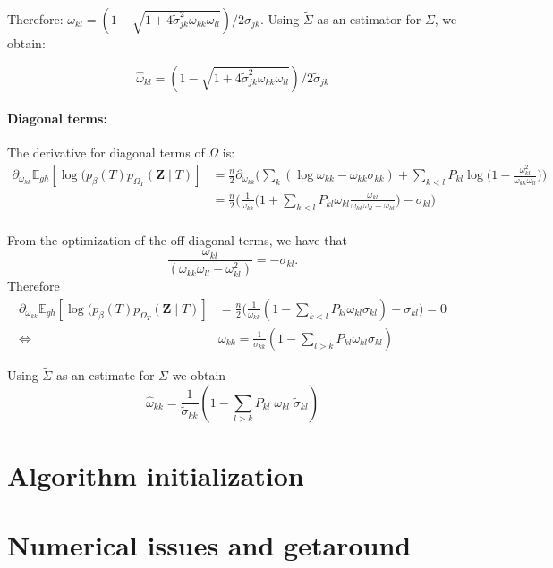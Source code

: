 \documentclass[11pt,a4paper]{article}
\newcommand{\Zbf}{\boldsymbol{Z}}
\newcommand{\Esp}{\mathds{E}}
\begin{document}
Therefore: $ {\omega}_{kl} = (1 - \sqrt{1+4\widetilde{\sigma}_{jk}^2 \omega_{kk}\omega_{ll}}) / 2{\sigma}_{jk}$. Using $\widetilde{\Sigma}$ as an estimator for $\Sigma$, we obtain:

$$\boxed{ \widehat{\omega}_{kl} = (1 - \sqrt{1+4\widetilde{\sigma}_{jk}^2 \omega_{kk}\omega_{ll}}) / 2\widetilde{\sigma}_{jk}}$$

\paragraph{Diagonal terms:\\}
The derivative for diagonal terms of $\Omega$ is:
\begin{align*}
 \partial_{\omega_{kk}}\Esp_{gh} [\log (p_\beta(T)p_{\Omega_T}(\Zbf\mid T) ] &=\frac{n}{2} \partial_{\omega_{kk}} \Big( \sum_k (\log \omega_{kk} - \omega_{kk} \sigma_{kk} )+  \sum_{k<l} P_{kl} \log \big(1-\frac{\omega_{kl}^2}{\omega_{kk} \omega_{ll}}\big)\Big)\\
 &=\frac{n}{2} \Big( \frac{1}{\omega_{kk}} \Big( 1 + \sum_{k<l} P_{kl} \omega_{kl} \frac{\omega_{kl}}{\omega_{kk}\omega_{ll} - \omega_{kl}}\Big) - \sigma_{kl}\Big)\\
  \end{align*}

From the optimization of the off-diagonal terms, we have that $$\frac{\omega_{kl}}{(\omega_{kk}\omega_{ll}-\omega_{kl}^2)}  = - {\sigma}_{kl} . $$
Therefore
 \begin{align*}
 \partial_{\omega_{kk}}\Esp_{gh} [\log (p_\beta(T)p_{\Omega_T}(\Zbf\mid T) ] 
  &=\frac{n}{2} \Big( \frac{1}{\omega_{kk}} ( 1 - \sum_{k<l} P_{kl} \omega_{kl} \sigma_{kl} ) - \sigma_{kl}\Big) = 0 \\
  \iff &  \omega_{kk}=\frac{1}{\sigma_{kk}} \left(1-\sum_{l>k} P_{kl}\omega_{kl}\sigma_{kl} \right)  
\end{align*}

Using $\widetilde{\Sigma}$ as an estimate for $\Sigma$ we obtain
$$\boxed{ \hat{\omega}_{kk} = \frac{1}{\widetilde{\sigma}_{kk}} \left( 1- \sum_{l>k}  P_{kl} \;\omega_{kl} \;\widetilde{\sigma}_{kl}\right)}$$
 
\section{Algorithm initialization}
\section{Numerical issues and getaround}
\end{document}

